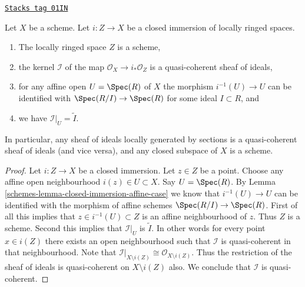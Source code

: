 \begin{lemma}
\label{schemes-lemma-closed-subspace-scheme}
\href{https://stacks.math.columbia.edu/tag/01IN}{\texttt{Stacks tag 01IN}}

Let $X$ be a scheme. Let $i : Z \to X$ be a closed immersion
of locally ringed spaces.
\begin{enumerate}
\item The locally ringed space $Z$ is a scheme,
\item the kernel $\mathcal{I}$ of the map
$\mathcal{O}_X \to i_*\mathcal{O}_Z$ is a quasi-coherent
sheaf of ideals,
\item for any affine open $U = \Spec(R)$ of $X$
the morphism $i^{-1}(U) \to U$ can be identified with
$\Spec(R/I) \to \Spec(R)$ for some ideal $I \subset R$, and
\item we have $\mathcal{I}|_U = \widetilde I$.
\end{enumerate}
In particular, any sheaf of ideals locally generated by sections
is a quasi-coherent sheaf of ideals (and vice versa),
and any closed subspace of $X$ is a scheme.
\end{lemma}

\begin{proof}

Let $i : Z \to X$ be a closed immersion.
Let $z \in Z$ be a point. Choose any affine open
neighbourhood $i(z) \in U \subset X$. Say $U = \Spec(R)$.
By Lemma \ref{schemes-lemma-closed-immersion-affine-case} we know
that $i^{-1}(U) \to U$ can be identified with the morphism
of affine schemes $\Spec(R/I) \to \Spec(R)$.
First of all this implies that $z \in i^{-1}(U) \subset Z$ is an
affine neighbourhood of $z$. Thus $Z$ is a scheme. Second
this implies that $\mathcal{I}|_U$ is $\widetilde I$.
In other words for every point $x \in i(Z)$ there exists an
open neighbourhood such that $\mathcal{I}$ is quasi-coherent in
that neighbourhood. Note that $\mathcal{I}|_{X \setminus i(Z)}
\cong \mathcal{O}_{X \setminus i(Z)}$. Thus the restriction
of the sheaf of ideals is quasi-coherent on $X \setminus i(Z)$
also. We conclude that $\mathcal{I}$ is quasi-coherent.
\end{proof}

